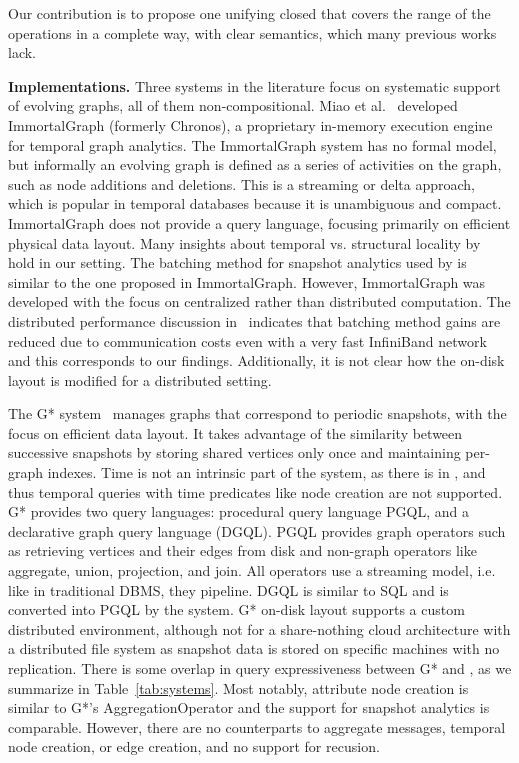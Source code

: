 Our contribution is to propose one unifying closed \tga that covers
the range of the operations in a complete way, with clear semantics,
which many previous works lack.

{\bf Implementations.}  Three systems in the literature focus on
systematic support of evolving graphs, all of them non-compositional.
Miao et al.~\cite{Miao2015} developed ImmortalGraph (formerly
Chronos), a proprietary in-memory execution engine for temporal graph
analytics.  The ImmortalGraph system has no formal model, but
informally an evolving graph is defined as a series of activities on
the graph, such as node additions and deletions.  This is a streaming
or delta approach, which is popular in temporal databases because it
is unambiguous and compact.  ImmortalGraph does not provide a query
language, focusing primarily on efficient physical data layout.  Many
insights about temporal vs. structural locality by~\cite{Miao2015}
hold in our setting.  The batching method for snapshot analytics used
by \og is similar to the one proposed in ImmortalGraph.  However,
ImmortalGraph was developed with the focus on centralized rather than
distributed computation.  The distributed performance discussion
in~\cite{Miao2015} indicates that batching method gains are reduced
due to communication costs even with a very fast InfiniBand network
and this corresponds to our findings.  Additionally, it is not clear
how the on-disk layout is modified for a distributed setting.

The G* system~\cite{Labouseur2015} manages graphs that correspond to
periodic snapshots, with the focus on efficient data layout.  It takes
advantage of the similarity between successive snapshots by storing
shared vertices only once and maintaining per-graph indexes.  Time is
not an intrinsic part of the system, as there is in \tga, and thus
temporal queries with time predicates like node creation are not
supported.  G* provides two query languages: procedural query language
PGQL, and a declarative graph query language (DGQL). PGQL provides
graph operators such as retrieving vertices and their edges from disk
and non-graph operators like aggregate, union, projection, and join.
All operators use a streaming model, i.e. like in traditional DBMS,
they pipeline.  DGQL is similar to SQL and is converted into PGQL by
the system.  G* on-disk layout supports a custom distributed
environment, although not for a share-nothing cloud architecture with
a distributed file system as snapshot data is stored on specific
machines with no replication.  There is some overlap in query
expressiveness between G* and \tga, as we summarize in
Table~\ref{tab:systems}.  Most notably, \tga attribute node creation
is similar to G*'s AggregationOperator and the support for snapshot
analytics is comparable.  However, there are no counterparts to \tga
aggregate messages, temporal node creation, or edge creation, and no
support for recusion.

